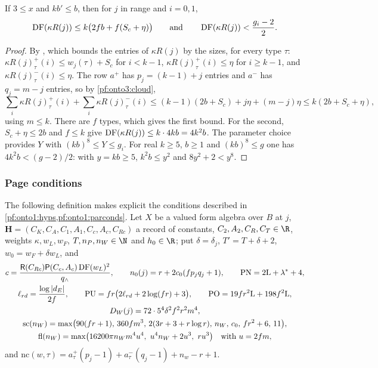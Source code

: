 \begin{lemma}\label{pf:onto3:dfka}
If $3\le x$ and $kb'\le b$, then for $j$ in range and $i=0,1$,
\[
\operatorname{DF}(\kappa R(j))\le k\bigl(2fb+f(S_c+\eta)\bigr)\qquad\text{and}\qquad\operatorname{DF}(\kappa R(j))<\frac{g_i-2}2 .
\]
\end{lemma}

\begin{proof}
By , which bounds the entries of $\kappa R(j)$ by the sizes, for
every type $\tau$: $\kappa R(j)^+_\tau(i)\le w_j(\tau)+S_c$ for $i<k-1$, $\kappa R(j)^+_\tau(i)\le\eta$ for $i\ge k-1$,
and $\kappa R(j)^-_\tau(i)\le\eta$. The row $a^+$ has $p_j=(k-1)+j$ entries and $a^-$ has $q_j=m-j$ entries, so by
\cref{pf:onto3:cloud},
\[
\sum_i\kappa R(j)^+_\tau(i)+\sum_i\kappa R(j)^-_\tau(i)\le(k-1)(2b+S_c)+j\eta+(m-j)\eta\le k(2b+S_c+\eta),
\]
using $m\le k$. There are $f$ types, which gives the first bound. For the second, $S_c+\eta\le2b$ and $f\le k$ give
$\operatorname{DF}(\kappa R(j))\le k\cdot4kb=4k^2b$. The parameter choice provides $Y$ with $(kb)^8\le Y\le g_i$. For real
$k\ge5$, $b\ge1$ and $(kb)^8\le g$ one has $4k^2b<(g-2)/2$: with $y=kb\ge5$, $k^2b\le y^2$ and $8y^2+2<y^8$.
\end{proof}

\subsubsection{Page conditions}

The following definition makes explicit the conditions described in \cref{pf:onto1:hyps,pf:onto1:parconds}. Let $X$ be
a valued form algebra over $B$ at $j$, $\mathbf H=(C_K,C_A,C_1,A_1,C_c,A_c,C_{Rc})$ a record of constants, $C_2,A_2,C_R,
C_T\in\R$, weights $\kappa,w_L,w_F$, $T,n_P,n_W\in\N$ and $h_0\in\R$; put $\delta=\delta_j$, $T'=T+\delta+2$, $w_0=w_F+
\delta w_L$, and
\begin{gather*}
c=\frac{\ontothreeRR(C_{Rc})\ontothreePP(C_c,A_c)\ontothreeDF(w_L)^2}{q_\wedge},\qquad
n_0(j)=r+2c_0(fp_jq_j+1),\qquad \mathrm{PN}=2\mathrm L+\lambda^*+4,\\
\ell_{rd}=\frac{\log|d_E|}{2f},\qquad\mathrm{PU}=fr\bigl(2\ell_{rd}+2\log(fr)+3\bigr),\qquad
\mathrm{PO}=19fr^2\mathrm L+198f^2\mathrm L,\\
D_W(j)=72\cdot5^4\delta^2f^2r^2m^4,\\
\mathrm{sc}(n_W)=\max\bigl(90(fr+1),\,360fm^3,\,2(3r+3+r\log r),\,n_W,\,c_0,\,fr^2+6,\,11\bigr),\\
\mathrm{fl}(n_W)=\max\bigl(16200\pi n_Wm^4u^4,\ u^4n_W+2u^3,\ ru^3\bigr)\quad\text{with }u=2fm,
\end{gather*}
and $\mathrm{nc}(w,\tau)=a^+_\tau(p_j-1)+a^-_\tau(q_j-1)+n_w-r+1$.

